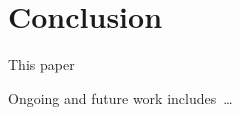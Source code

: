 \documentclass[runningheads]{llncs}
\begin{document}
\section{Conclusion}
\label{Conclusion}

This paper 

Ongoing and future work includes~\ldots



\end{document}
